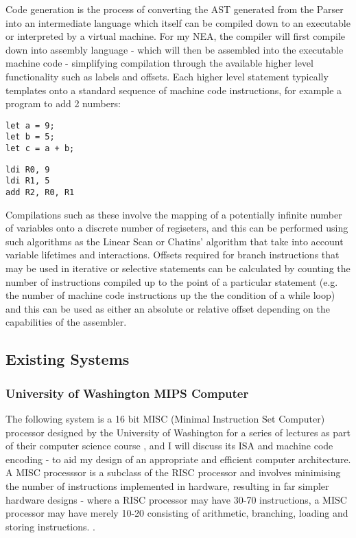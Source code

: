 Code generation is the process of converting the AST generated from the Parser into an intermediate language which itself can be compiled down to an executable or interpreted by a virtual machine. For my NEA, the compiler will first compile down into assembly language - which will then be assembled into the executable machine code - simplifying compilation through the available higher level functionality such as labels and offsets. Each higher level statement typically templates onto a standard sequence of machine code instructions, for example a program to add 2 numbers:
\begin{lstlisting}
let a = 9;
let b = 5;
let c = a + b;
\end{lstlisting}
\begin{lstlisting}
ldi R0, 9
ldi R1, 5
add R2, R0, R1
\end{lstlisting}
Compilations such as these involve the mapping of a potentially infinite number of variables onto a discrete number of regiseters, and this can be performed using such algorithms as the Linear Scan or Chatins' algorithm \textcite{GFG-linearscan} that take into account variable lifetimes and interactions. Offsets required for branch instructions that may be used in iterative or selective statements can be calculated by counting the number of instructions compiled up to the point of a particular statement (e.g. the number of machine code instructions up the the condition of a while loop) and this can be used as either an absolute or relative offset depending on the capabilities of the assembler.

\subsection{Existing Systems}
\subsubsection{University of Washington MIPS Computer}
\label{sec:UoW}
The following system is a 16 bit MISC (Minimal Instruction Set Computer) processor designed by the University of Washington for a series of lectures as part of their computer science course \textcite{MIPS-uw}, and I will discuss its ISA and machine code encoding - to aid my design of an appropriate and efficient computer architecture. A MISC processsor is a subclass of the RISC processor and involves minimising the number of instructions implemented in hardware, resulting in far simpler hardware designs - where a RISC processor may have 30-70 instructions, a MISC processor may have merely 10-20 consisting of arithmetic, branching, loading and storing instructions. \textcite{MISC-dakeng}. 


